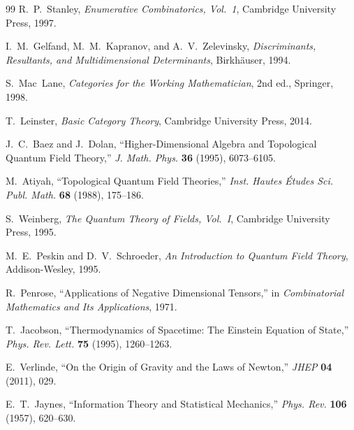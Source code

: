 \documentclass[12pt, oneside]{amsart}
\theoremstyle{plain}
\theoremstyle{definition}
\theoremstyle{remark}
\begin{document}
\begin{thebibliography}{99}
R.~P.~Stanley,
\newblock \textit{Enumerative Combinatorics, Vol.\ 1},
\newblock Cambridge University Press, 1997.

I.~M.~Gelfand, M.~M.~Kapranov, and A.~V.~Zelevinsky,
\newblock \textit{Discriminants, Resultants, and Multidimensional Determinants},
\newblock Birkh\"{a}user, 1994.


S.~Mac~Lane,
\newblock \textit{Categories for the Working Mathematician},
\newblock 2nd ed., Springer, 1998.

T.~Leinster,
\newblock \textit{Basic Category Theory},
\newblock Cambridge University Press, 2014.

J.~C.~Baez and J.~Dolan,
\newblock ``Higher-Dimensional Algebra and Topological Quantum Field Theory,''
\newblock \textit{J. Math. Phys.} \textbf{36} (1995), 6073--6105.

M.~Atiyah,
\newblock ``Topological Quantum Field Theories,''
\newblock \textit{Inst. Hautes \'{E}tudes Sci. Publ. Math.} \textbf{68} (1988), 175--186.


S.~Weinberg,
\newblock \textit{The Quantum Theory of Fields, Vol.\ I},
\newblock Cambridge University Press, 1995.

M.~E.~Peskin and D.~V.~Schroeder,
\newblock \textit{An Introduction to Quantum Field Theory},
\newblock Addison-Wesley, 1995.

R.~Penrose,
\newblock ``Applications of Negative Dimensional Tensors,''
\newblock in \textit{Combinatorial Mathematics and Its Applications}, 1971.


T.~Jacobson,
\newblock ``Thermodynamics of Spacetime: The Einstein Equation of State,''
\newblock \textit{Phys. Rev. Lett.} \textbf{75} (1995), 1260--1263.

E.~Verlinde,
\newblock ``On the Origin of Gravity and the Laws of Newton,''
\newblock \textit{JHEP} \textbf{04} (2011), 029.

E.~T.~Jaynes,
\newblock ``Information Theory and Statistical Mechanics,''
\newblock \textit{Phys. Rev.} \textbf{106} (1957), 620--630.


\end{thebibliography}
\end{document}
